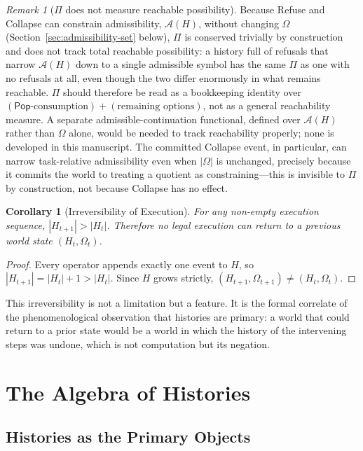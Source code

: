 \documentclass[12pt, a4paper, openany]{book}
\theoremstyle{plain}
\newtheorem{corollary}[theorem]{Corollary}
\theoremstyle{definition}
\theoremstyle{remark}
\newtheorem{remark}[theorem]{Remark}
\newcommand{\Pop}{\mathsf{Pop}}
\newcommand{\calA}{\mathcal{A}}
\begin{document}
\begin{remark}[$\Pi$ does not measure reachable possibility]
Because Refuse and Collapse can constrain admissibility, $\calA(H)$, without
changing $\Omega$ (Section~\ref{sec:admissibility-set} below), $\Pi$ is
conserved trivially by construction and does not track total reachable
possibility: a history full of refusals that narrow $\calA(H)$ down to a
single admissible symbol has the same $\Pi$ as one with no refusals at all,
even though the two differ enormously in what remains reachable. $\Pi$ should
therefore be read as a bookkeeping identity over $(\Pop\text{-consumption}) +
(\text{remaining options})$, not as a general reachability measure. A separate
admissible-continuation functional, defined over $\calA(H)$ rather than
$\Omega$ alone, would be needed to track reachability properly; none is
developed in this manuscript. The committed Collapse event, in particular, can
narrow task-relative admissibility even when $|\Omega|$ is unchanged, precisely
because it commits the world to treating a quotient as constraining---this is
invisible to $\Pi$ by construction, not because Collapse has no effect.
\end{remark}

\begin{corollary}[Irreversibility of Execution]
For any non-empty execution sequence, $|H_{t+1}| > |H_t|$. Therefore no legal
execution can return to a previous world state $(H_t, \Omega_t)$.
\end{corollary}

\begin{proof}
Every operator appends exactly one event to $H$, so $|H_{t+1}| = |H_t| + 1 > |H_t|$.
Since $H$ grows strictly, $(H_{t+1}, \Omega_{t+1}) \neq (H_t, \Omega_t)$.
\end{proof}

This irreversibility is not a limitation but a feature. It is the formal
correlate of the phenomenological observation that histories are primary: a world
that could return to a prior state would be a world in which the history of
the intervening steps was undone, which is not computation but its negation.

\chapter{The Algebra of Histories}

\section{Histories as the Primary Objects}
\end{document}
